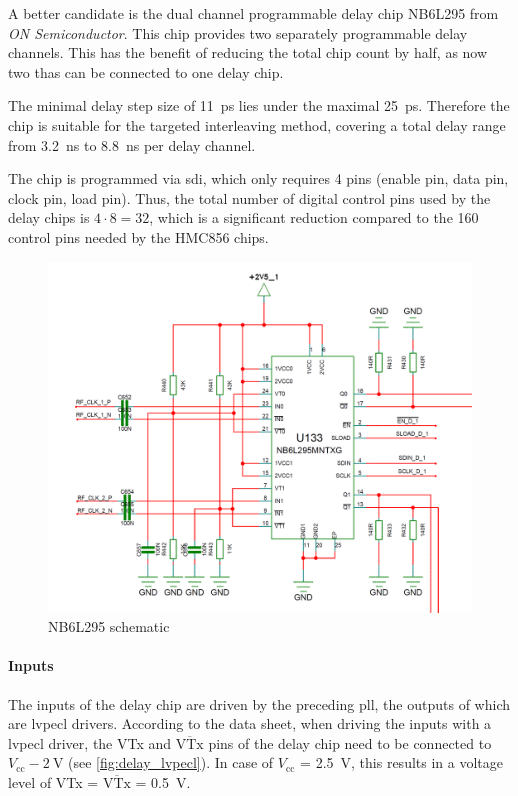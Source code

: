 A better candidate is the dual channel programmable delay chip NB6L295 from \textit{ON Semiconductor}. 
This chip provides two separately programmable delay channels. This has the benefit of reducing the total chip count by half, as now two \glspl{tha} can be connected to one delay chip.

The minimal delay step size of \SI{11}{\pico\second} lies under the maximal \SI{25}{\pico \second}. Therefore the chip is suitable for the targeted interleaving method, covering a total delay range from \SI{3.2}{\nano\second} to \SI{8.8}{\nano\second} per delay channel.

The chip is programmed via \gls{sdi}, which only requires 4 pins (enable pin, data pin, clock pin, load pin). %
Thus, the total number of digital control pins used by the delay chips is $4\cdot8 = 32$, which is a significant reduction compared to the 160 control pins needed by the HMC856 chips.
\begin{figure}[tbh]
	\centering
	\includegraphics[width = \textwidth]{chap/04-work/img/delay_chip}
	\caption[NB6L295 delay chip schematic]{NB6L295 schematic}
	\label{fig:nb6l295}
\end{figure}


\paragraph{Inputs}
The inputs of the delay chip are driven by the preceding \gls{pll}, the outputs of which are \gls{lvpecl} drivers.
According to the data sheet, when driving the inputs with a \gls{lvpecl} driver, the VTx and $\overline{\text{VTx}}$ pins of the delay chip need to be connected to $V_\text{cc} - \SI{2}{\volt}$ (see \autoref{fig:delay_lvpecl}).
In case of $V_\text{cc}$ = \SI{2.5}{\volt}, this results in a voltage level of VTx = $\overline{\text{VTx}}$ = \SI{0.5}{\volt}.

